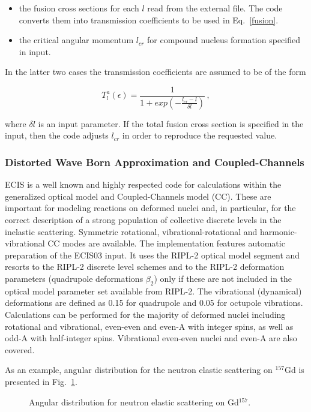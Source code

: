 \documentclass[twocolumn,amsmath,amssymb,10pt,groupedaddress,a4paper]{revtex4}
\begin{document}
\begin{itemize}
\item the fusion cross sections for each $l$ read from the external
file. The code converts them into transmission
coefficients to be used in Eq.~\ref{fusion}. \\
\item the critical angular momentum $l_{cr}$ for compound nucleus
formation specified in input.
\end{itemize}

In the latter two cases the transmission coefficients are assumed
to be of the form

\begin{equation}
T_{l}^{a}(\epsilon)=\frac{1}{1+exp(-\frac{l_{cr}-l}{\delta l})}\,,\label{Tlfus}
\end{equation}

\noindent where $\delta l$ is an input parameter. If the total fusion
cross section is specified in the input, then the code adjusts $l_{cr}$
in order to reproduce the requested value.


\subsubsection{Distorted Wave Born Approximation and Coupled-Channels \label{sec:DWBA-CC}}
ECIS \cite{ECIS} is a well known and highly respected code for calculations
within the generalized optical model and Coupled-Channels model (CC).
These are important for modeling reactions on deformed nuclei and,
in particular, for the correct description of a strong population
of collective discrete levels in the inelastic scattering.  Symmetric
rotational, vibrational-rotational and harmonic-vibrational CC modes
are available. The implementation features automatic preparation of
the ECIS03 input. It uses the RIPL-2 \cite{RIPL2} optical
model segment and resorts to the RIPL-2 discrete level schemes and
to the RIPL-2 deformation parameters (quadrupole deformations
$\beta _{2}$) only if these are not included in the optical model
parameter set available from RIPL-2. The
vibrational (dynamical) deformations are defined
 as 0.15 for quadrupole and 0.05 for octupole vibrations.
Calculations can be performed for the majority of deformed nuclei
including rotational and vibrational, even-even and even-A with integer
spins, as well as odd-A with half-integer spins. Vibrational even-even
nuclei and even-A are also covered.

As an example, angular distribution for the neutron elastic scattering on $^{157}$Gd
is presented in Fig.~\ref{njoygd157}.
\begin{figure}[htbp]
\caption{Angular distribution for neutron elastic scattering on Gd$^{157}$.}
\label{njoygd157}
\end{figure}
\end{document}
